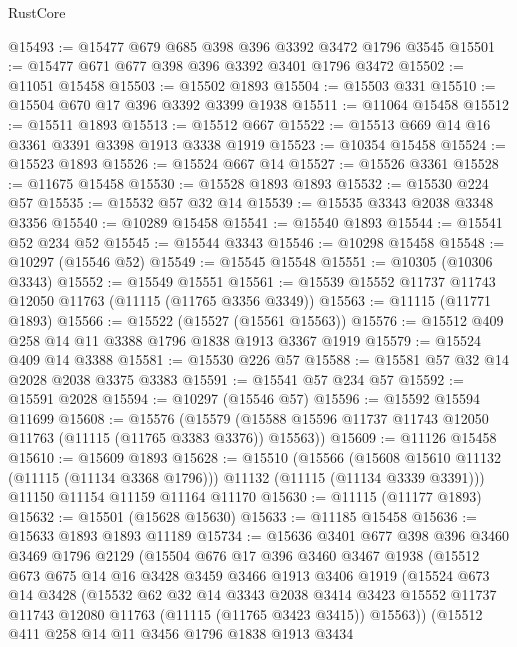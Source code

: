 \begin{lexlean}{RustCore}
\begin{coremodule}
@15493 := @15477 @679 @685 @398 @396 @3392 @3472 @1796 @3545
@15501 := @15477 @671 @677 @398 @396 @3392 @3401 @1796 @3472
@15502 := @11051 @15458
@15503 := @15502 @1893
@15504 := @15503 @331
@15510 := @15504 @670 @17 @396 @3392 @3399 @1938
@15511 := @11064 @15458
@15512 := @15511 @1893
@15513 := @15512 @667
@15522 := @15513 @669 @14 @16 @3361 @3391 @3398 @1913 @3338 @1919
@15523 := @10354 @15458
@15524 := @15523 @1893
@15526 := @15524 @667 @14
@15527 := @15526 @3361
@15528 := @11675 @15458
@15530 := @15528 @1893 @1893
@15532 := @15530 @224 @57
@15535 := @15532 @57 @32 @14
@15539 := @15535 @3343 @2038 @3348 @3356
@15540 := @10289 @15458
@15541 := @15540 @1893
@15544 := @15541 @52 @234 @52
@15545 := @15544 @3343
@15546 := @10298 @15458
@15548 := @10297 (@15546 @52)
@15549 := @15545 @15548
@15551 := @10305 (@10306 @3343)
@15552 := @15549 @15551
@15561 := @15539 @15552 @11737 @11743 @12050 @11763 (@11115 (@11765 @3356 @3349))
@15563 := @11115 (@11771 @1893)
@15566 := @15522 (@15527 (@15561 @15563))
@15576 := @15512 @409 @258 @14 @11 @3388 @1796 @1838 @1913 @3367 @1919
@15579 := @15524 @409 @14 @3388
@15581 := @15530 @226 @57
@15588 := @15581 @57 @32 @14 @2028 @2038 @3375 @3383
@15591 := @15541 @57 @234 @57
@15592 := @15591 @2028
@15594 := @10297 (@15546 @57)
@15596 := @15592 @15594 @11699
@15608 := @15576
    (@15579 (@15588 @15596 @11737 @11743 @12050 @11763 (@11115 (@11765 @3383 @3376)) @15563))
@15609 := @11126 @15458
@15610 := @15609 @1893
@15628 := @15510
    (@15566
      (@15608 @15610 @11132 (@11115 (@11134 @3368 @1796)))
      @11132
      (@11115 (@11134 @3339 @3391)))
    @11150
    @11154
    @11159
    @11164
    @11170
@15630 := @11115 (@11177 @1893)
@15632 := @15501 (@15628 @15630)
@15633 := @11185 @15458
@15636 := @15633 @1893 @1893 @11189
@15734 := @15636
    @3401
    @677
    @398
    @396
    @3460
    @3469
    @1796
    @2129
    (@15504
      @676
      @17
      @396
      @3460
      @3467
      @1938
      (@15512
        @673
        @675
        @14
        @16
        @3428
        @3459
        @3466
        @1913
        @3406
        @1919
        (@15524
          @673
          @14
          @3428
          (@15532
            @62
            @32
            @14
            @3343
            @2038
            @3414
            @3423
            @15552
            @11737
            @11743
            @12080
            @11763
            (@11115 (@11765 @3423 @3415))
            @15563))
        (@15512
          @411
          @258
          @14
          @11
          @3456
          @1796
          @1838
          @1913
          @3434

\end{coremodule}
\end{lexlean}
